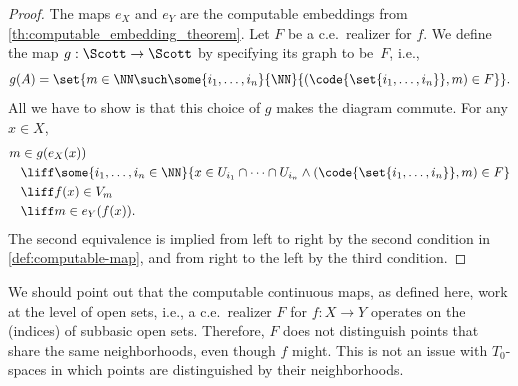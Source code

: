 
\begin{proof}
  The maps $e_X$ and $e_Y$ are the computable embeddings from
  \cref{th:computable_embedding_theorem}. Let $F$ be a
  c.e.~realizer for $f$. We define the map $g: \Scott \to \Scott$ by
  specifying its graph to be~$F$, i.e.,
  \begin{equation*}
    g(A) = \set{m \in \NN \such
      \some{i_1, \ldots, i_n}{\NN}{
        (\code{\set{i_1, \ldots, i_n}}, m) \in F
      }}.
  \end{equation*}
  All we have to show is that this choice of $g$ makes the diagram
  commute. For any $x \in X$,
  \begin{align*}
    m &\in g(e_X(x)) \\
      &\liff
      \some{i_1, \ldots, i_n \in \NN}{
        x \in U_{i_1} \cap \cdots \cap U_{i_n} \land
        (\code{\set{i_1, \ldots, i_n}}, m) \in F
      } \\
      &\liff
      f(x) \in V_m
      \\
      &\liff
      m \in e_Y(f(x)).
  \end{align*}
  The second equivalence is implied from left to right by the second
  condition in \cref{def:computable-map}, and from right to
  the left by the third condition.
\end{proof}

We should point out that the computable continuous maps, as defined
here, work at the level of open sets, i.e., a c.e.~realizer $F$ for $f
: X \to Y$ operates on the (indices) of subbasic open sets. Therefore,
$F$ does not distinguish points that share the same neighborhoods,
even though $f$ might. This is not an issue with $T_0$-spaces in which
points are distinguished by their neighborhoods.



